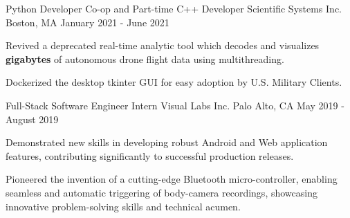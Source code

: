 \begin{cventries}
  \cventry
    {Python Developer Co-op and Part-time C++ Developer} %
    {Scientific Systems Inc.} %
    {Boston, MA} %
    {January 2021 - June 2021} %
    {
      \begin{cvitems} %
         \item {Revived a deprecated real-time analytic tool which decodes and visualizes \textbf{gigabytes} of autonomous drone flight data using multithreading.}
        \item {Dockerized the desktop tkinter GUI for easy adoption by U.S. Military Clients.}
      \end{cvitems}
    }
  \cventry
    {Full-Stack Software Engineer Intern} %
    {Visual Labs Inc.} %
    {Palo Alto, CA} %
    {May 2019 - August 2019} %
    {
      \begin{cvitems} %
      \item {Demonstrated new skills in developing robust Android and Web application features, contributing significantly to successful production releases.}
      \item {Pioneered the invention of a cutting-edge Bluetooth micro-controller, 
        enabling seamless and automatic triggering of body-camera recordings, showcasing innovative problem-solving skills and technical acumen.}
      \end{cvitems}
    }

\end{cventries}
